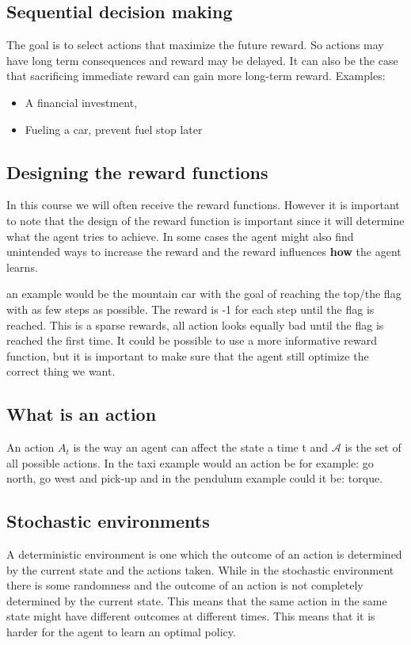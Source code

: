 \subsection{Sequential decision making}
The goal is to select actions that maximize the future reward. So actions may have long term consequences and reward may be delayed. It can also be the case that sacrificing immediate reward can gain more long-term reward. Examples:

\begin{itemize}
	\item A financial investment,
	\item Fueling a car, prevent fuel stop later 
\end{itemize}

\subsection{Designing the reward functions}
In this course we will often receive the reward functions. However it is important to note that the design of the reward function is important since it will determine what the agent tries to achieve. In some cases the agent might also find unintended ways to increase the reward and the reward influences \textbf{how} the agent learns. 

an example would be the mountain car with the goal of reaching the top/the flag with as few steps as possible. The reward is -1 for each step until the flag is reached. This is a sparse rewards, all action looks equally bad until the flag is reached the first time. It could be possible to use a more informative reward function, but it is important to make sure that the agent still optimize the correct thing we want. 


\subsection{What is an action}
An action $A_t$ is the way an agent can affect the state a time t and $\mathcal{A}$ is the set of all possible actions. In the taxi example would an action be for example: go north, go west and pick-up and in the pendulum example could it be: torque.

\subsection{Stochastic environments}
A deterministic environment is one which the outcome of an action is determined by the current state and the actions taken. While in the stochastic environment there is some randomness and the outcome of an action is not completely determined by the current state. This means that the same action in the same state might have different outcomes at different times. This means that it is harder for the agent to learn an optimal policy. 


